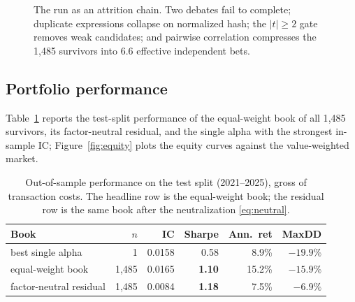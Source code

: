 \documentclass{article}
\theoremstyle{definition}
\theoremstyle{plain}
\theoremstyle{remark}
\begin{document}
\begin{figure}[h]
\centering
{}
\caption{The run as an attrition chain. Two debates fail to complete; duplicate
expressions collapse on normalized hash; the $|t|\ge2$ gate removes weak candidates;
and pairwise correlation compresses the 1{,}485 survivors into 6.6 effective
independent bets.}
\label{fig:funnel}
\end{figure}

\subsection{Portfolio performance}
\label{sec:res-portfolio}

Table~\ref{tab:portfolio} reports the test-split performance of the equal-weight book of
all 1{,}485 survivors, its factor-neutral residual, and the single alpha with the
strongest in-sample IC; Figure~\ref{fig:equity} plots the equity curves against the
value-weighted market.

\begin{table}[h]
\centering
\small
\begin{tabular}{@{}lrrrrr@{}}
\toprule
Book & $n$ & IC & Sharpe & Ann.\ ret & MaxDD \\
\midrule
best single alpha & 1 & 0.0158 & 0.58 & 8.9\% & $-19.9\%$ \\
equal-weight book & 1{,}485 & 0.0165 & \textbf{1.10} & 15.2\% & $-15.9\%$ \\
factor-neutral residual & 1{,}485 & 0.0084 & \textbf{1.18} & 7.5\% & $-6.9\%$ \\
\bottomrule
\end{tabular}
\caption{Out-of-sample performance on the test split (2021--2025), gross of transaction
costs. The headline row is the equal-weight book; the residual row is the same book
after the neutralization \eqref{eq:neutral}.}
\label{tab:portfolio}
\end{table}
\end{document}

